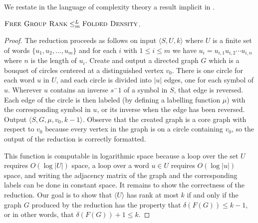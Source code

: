\documentclass{article}
\newcommand{\FGR}{\textsc{Free Group Rank}}
\newcommand{\FD}{\textsc{Folded Density}}
\newcommand{\triple}[3]{\langle #1, #2, #3 \rangle}
\newcommand{\quint}[5]{\langle #1, #2, #3, #4, #5 \rangle}
\newcommand{\gen}[1]{\langle #1 \rangle}
\begin{document}
We restate in the language of complexity theory a result implicit in \cite{km02}.
\begin{theorem}
  $\FGR \leq_m^L \FD$.
\end{theorem}
\begin{proof}
  The reduction proceeds as follows on input $\triple{S}{U}{k}$ where $U$ is a finite set of words $\{u_1, u_2, \dotsc, u_m\}$ and for each $i$ with $1 \leq i \leq m$ we have $u_i = u_{i, 1}u_{i, 2}\dotsb u_{i, n}$ where $n$ is the length of $u_i$.
  Create and output a directed graph $G$ which is a bouquet of circles centered at a distinguished vertex $v_0$.
  There is one circle for each word $u$ in $U$, and each circle is divided into $|u|$ edges, one for each symbol of $u$.
  Wherever $u$ contains an inverse $s^-1$ of a symbol in $S$, that edge is reversed.
  Each edge of the circle is then labeled (by defining a labelling function $\mu$) with the corresponding symbol in $u$, or its inverse when the edge has been reversed.
  Output $\quint{S}{G}{\mu}{v_0}{k - 1}$.
  Observe that the created graph is a core graph with respect to $v_0$ because every vertex in the graph is on a circle containing $v_0$, so the output of the reduction is correctly formatted.

  This function is computable in logarithmic space because a loop over the set $U$ requires $O(\log |U|)$ space, a loop over a word $u \in U$ requires $O(\log |u|)$ space, and writing the adjacency matrix of the graph and the corresponding labels can be done in constant space.
  It remains to show the correctness of the reduction.
  Our goal is to show that $\gen{U}$ has rank at most $k$ if and only if the graph $G$ produced by the reduction has the property that $\delta(F(G)) \leq k - 1$, or in other words, that $\delta(F(G)) + 1 \leq k$.


\end{proof}
\end{document}
